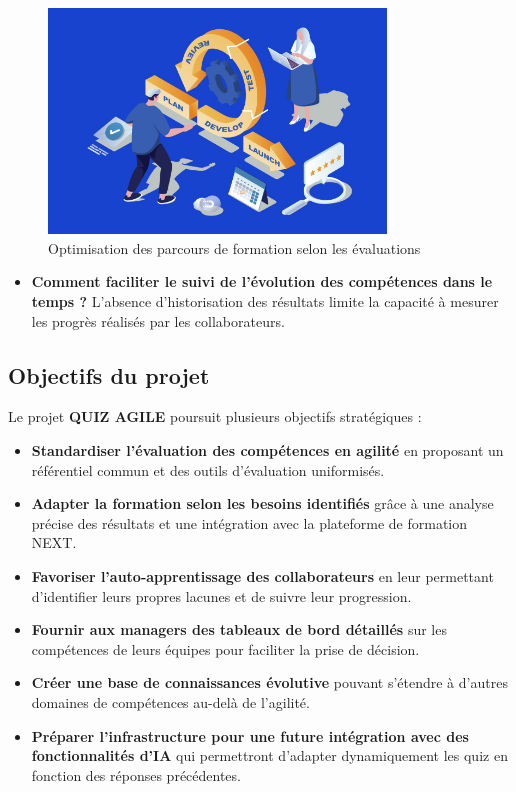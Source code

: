 \documentclass[12pt,a4paper]{report}
\begin{document}
\begin{figure}[H]
\centering
\includegraphics[width=0.8\textwidth]{latex_media/media/image7.jpeg}
\caption{Optimisation des parcours de formation selon les évaluations}
\label{fig:optimisation-parcours}
\end{figure}

\begin{itemize}
\item \textbf{Comment faciliter le suivi de l'évolution des compétences dans le temps ?} L'absence d'historisation des résultats limite la capacité à mesurer les progrès réalisés par les collaborateurs.
\end{itemize}

\subsection{Objectifs du projet}

Le projet \textbf{QUIZ AGILE} poursuit plusieurs objectifs stratégiques :

\begin{itemize}
\item \textbf{Standardiser l'évaluation des compétences en agilité} en proposant un référentiel commun et des outils d'évaluation uniformisés.
\item \textbf{Adapter la formation selon les besoins identifiés} grâce à une analyse précise des résultats et une intégration avec la plateforme de formation NEXT.
\item \textbf{Favoriser l'auto-apprentissage des collaborateurs} en leur permettant d'identifier leurs propres lacunes et de suivre leur progression.
\item \textbf{Fournir aux managers des tableaux de bord détaillés} sur les compétences de leurs équipes pour faciliter la prise de décision.
\item \textbf{Créer une base de connaissances évolutive} pouvant s'étendre à d'autres domaines de compétences au-delà de l'agilité.
\item \textbf{Préparer l'infrastructure pour une future intégration avec des fonctionnalités d'IA} qui permettront d'adapter dynamiquement les quiz en fonction des réponses précédentes.
\end{itemize}
\end{document}
